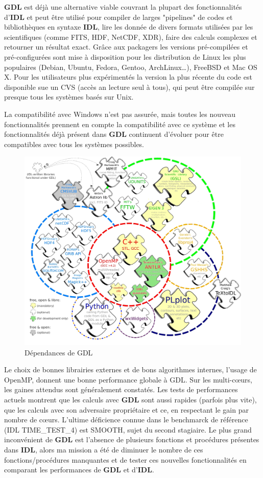\textbf{GDL} est déjà une alternative viable couvrant la plupart des fonctionnalités d'\textbf{IDL} et peut être utilisé pour compiler de larges "pipelines" de codes et bibliothèques en syntaxe \textbf{IDL}, lire les donnée de divers formats utilisées par les scientifiques (comme FITS, HDF, NetCDF, XDR), faire des calculs complexes et retourner un résultat exact. Grâce aux packagers les versions pré-compilées et pré-configurées sont mise à disposition pour les distribution de Linux les plus populaires (Debian, Ubuntu, Fedora, Gentoo, ArchLinux\ldots), FreeBSD et Mac OS X. Pour les utilisateurs plus expérimentés la version la plus récente du code est disponible sue un CVS (accès an lecture seul à tous), qui peut être compilée sur presque tous les systèmes basés sur Unix.

La compatibilité avec Windows n'est pas assurée, mais toutes les nouveau fonctionnalités prennent en compte la compatibilité avec ce système et les fonctionnalités déjà présent dans \textbf{GDL} continuent d'évoluer pour être compatibles avec tous les systèmes possibles.

\begin{figure}[!ht]
    \centerline{
    	\includegraphics[width=1.3\textwidth]{./images/gdl-mod.png}
    	}
    \caption{Dépendances de GDL}
    \label{gdl-dep}
\end{figure}
Le choix de bonnes librairies externes et de bons algorithmes internes, l'usage de OpenMP, donnent une bonne performance globale à GDL. Sur les multi-cœurs, les gaines attendus sont généralement constatés. Les tests de performances actuels montrent que les calculs avec \textbf{GDL} sont aussi rapides (parfois plus vite), que les calculs avec son  adversaire propriétaire et ce, en respectant le gain par nombre de cœurs. L'ultime déficience connue dans le benchmarck de référence (IDL TIME\_TEST\_4) est SMOOTH, sujet du second stagiaire.
Le plus grand inconvénient de \textbf{GDL} est l'absence de plusieurs fonctions et procédures présentes dans \textbf{IDL}, alors ma mission a été de diminuer le nombre de ces fonctions/procédures manquantes et de tester ces nouvelles fonctionnalités en comparant les performances de \textbf{GDL} et d'\textbf{IDL}.

